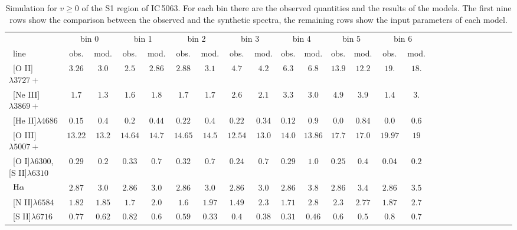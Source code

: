 \documentclass[../thesis.tex]{subfiles}
\begin{document}
\begin{landscape}
\begin{table}

\centering
\caption{Simulation for $v \ge 0$ of the S1 region of IC\,5063. For each bin there are the observed quantities and the results of the models. The first nine rows show the comparison between the observed and the synthetic spectra, the remaining rows show the input parameters of each model.}
\label{tab:sim_s1+}


\small{
\begin{tabular}{lcccccccccccccccccccccccc} 
\hline 
\ &\multicolumn{2}{c}{bin 0} &\multicolumn{2}{c}{bin 1}&\multicolumn{2}{c}{bin 2}&\multicolumn{2}{c}{bin 3}&\multicolumn{2}{c}{bin 4}&\multicolumn{2}{c}{bin 5}&\multicolumn{2}{c}{bin 6}\\
\   line              &obs.  &mod. &obs.  & mod.&obs.&mod.  &obs.  &mod.&obs.  &mod. &obs.  &mod. &obs. &mod.\\ 
\hline
\ [O II]$\lambda3727+ $         &$3.26  $&$3.0   $&$2.5    $&$ 2.86 $&$2.88 $&$3.1   $&$4.7   $&$4.2  $&$6.3   $&$6.8   $&$13.9  $&$12.2$&$19. $&$18.  $\\            
\ [Ne III]$\lambda3869+ $       &$1.7   $&$1.3   $&$1.6    $&$ 1.8  $&$1.7  $&$1.7   $&$2.6   $&$2.1   $&$3.3   $&$3.0   $&$4.9   $&$3.9$&$1.4 $&$3.   $\\            
\ [He II]$\lambda4686$           &$0.15  $&$0.4   $&$0.2    $&$ 0.44 $&$0.22 $&$0.4   $&$0.22  $&$0.34  $&$0.12  $&$0.9   $&$0.0   $&$0.84$&$0.0$&$0.6 $\\                      
\ [O III]$\lambda5007+ $        &$13.22 $&$13.2  $&$14.64  $&$ 14.7 $&$14.65$&$14.5  $&$12.54 $&$13.0  $&$ 14.0 $&$ 13.86$&$17.7  $&$17.0$&$19.97$&$19 $\\            
\ [O I]$\lambda6300$,[S II]$\lambda6310$  &$0.29  $&$0.2   $&$0.33   $&$0.7   $&$0.32 $&$0.7   $&$0.24  $&$0.7   $&$0.29  $&$1.0   $&$0.25  $&$0.4$&$0.04  $&$0.2  $\\            
\ $\rm H\alpha$                 &$2.87  $&$3.0   $&$2.86   $&$ 3.0  $&$2.86 $&$3.0   $&$2.86  $&$3.0   $&$2.86  $&$3.8   $&$2.86  $&$3.4$&$2.86  $&$3.5  $\\            
\ [N II]$\lambda6584$           &$1.82  $&$1.85  $&$1.7    $&$ 2.0  $&$1.6  $&$1.97  $&$1.49  $&$2.3   $&$1.71  $&$2.8   $&$2.3   $&$2.77$&$1.87 $&$2.7 $\\            
\ [S II]$\lambda6716$           &$0.77  $&$0.62  $&$0.82   $&$ 0.6  $&$0.59 $&$0.33  $&$0.4   $&$0.38  $&$0.31  $&$0.46  $&$0.6   $&$0.5 $&$0.8 $&$0.7 $\\            

\end{tabular}}
\end{table}
\end{landscape}
\end{document}
